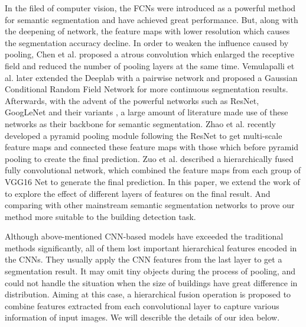 In the filed of computer vision, the FCNs \cite{IEEEexample:Long_2015_CVPR} were introduced as a powerful method for semantic segmentation and have achieved great performance. But, along with the deepening of network, the feature maps with lower resolution which causes the segmentation accuracy decline. In order to weaken the influence caused by pooling, Chen et al.\cite{IEEEexample:chen2016deeplab} proposed a atrous convolution which enlarged the receptive field and reduced the number of pooling layers at the same time. Vemulapalli et al.\cite{IEEEexample:vemulapalli2016gaussian} later extended the Deeplab \cite{IEEEexample:chen2016deeplab} with a pairwise network and proposed a Gaussian Conditional Random Field Network for more continuous segmentation results. Afterwards, with the advent of the powerful networks such as ResNet\cite{IEEEexample:he2016deep}, GoogLeNet\cite{IEEEexample:szegedy2015going} and their variants \cite{IEEEexample:szegedy2016rethinking}\cite{IEEEexample:szegedy2017inception}\cite{IEEEexample:xie2017aggregated}, a large amount of literature made use of these networks as their backbone for semantic segmentation. Zhao et al.\cite{IEEEexample:zhao2017contextually} recently developed a pyramid pooling module following the ResNet\cite{IEEEexample:he2016deep} to get multi-scale feature maps and connected these feature maps with those which before pyramid pooling to create the final prediction. Zuo et al.\cite{IEEEexample:zuo2016hf} described a hierarchically fused fully convolutional network, which combined the feature maps from each group of VGG16 Net to generate the final prediction. In this paper, we extend the work of\cite{IEEEexample:zuo2016hf} to explore the effect of different layers of features on the final result. And comparing with other mainstream semantic segmentation networks to prove our method more suitable to the building detection task.




Although above-mentioned CNN-based models have exceeded the traditional methods significantly, all of them lost important hierarchical features encoded in the CNNs. They usually apply the CNN features from the last layer to get a segmentation result. It may omit tiny objects during the process of pooling, and could not handle the situation when the size of buildings have great difference in distribution. Aiming at this case, a hierarchical fusion operation is proposed to combine features extracted from each convolutional layer to capture various information of input images. We will describle the details of our idea below.
